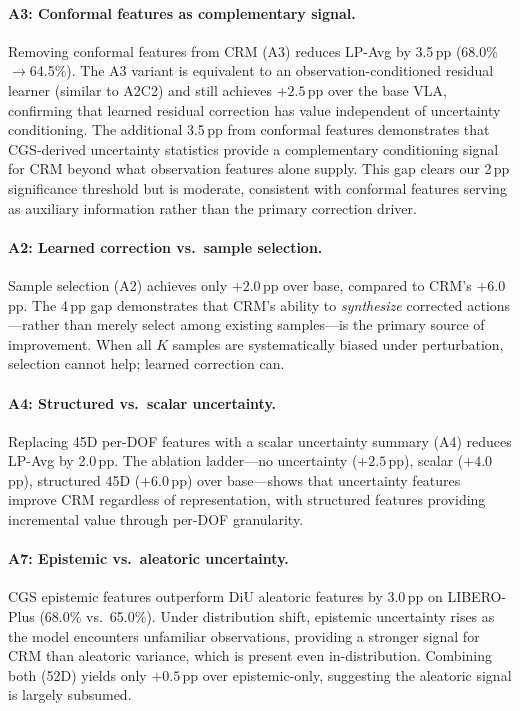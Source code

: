 \documentclass[10pt,twocolumn]{article}
\begin{document}
\paragraph{A3: Conformal features as complementary signal.}
Removing conformal features from CRM (A3) reduces LP-Avg by 3.5\,pp (68.0\%$\to$64.5\%).
The A3 variant is equivalent to an observation-conditioned residual learner (similar to A2C2) and still achieves $+2.5$\,pp over the base VLA, confirming that learned residual correction has value independent of uncertainty conditioning.
The additional 3.5\,pp from conformal features demonstrates that CGS-derived uncertainty statistics provide a complementary conditioning signal for CRM beyond what observation features alone supply.
This gap clears our 2\,pp significance threshold but is moderate, consistent with conformal features serving as auxiliary information rather than the primary correction driver.

\paragraph{A2: Learned correction vs.\ sample selection.}
Sample selection (A2) achieves only $+2.0$\,pp over base, compared to CRM's $+6.0$\,pp.
The 4\,pp gap demonstrates that CRM's ability to \emph{synthesize} corrected actions---rather than merely select among existing samples---is the primary source of improvement.
When all $K$ samples are systematically biased under perturbation, selection cannot help; learned correction can.

\paragraph{A4: Structured vs.\ scalar uncertainty.}
Replacing 45D per-DOF features with a scalar uncertainty summary (A4) reduces LP-Avg by 2.0\,pp.
The ablation ladder---no uncertainty ($+2.5$\,pp), scalar ($+4.0$\,pp), structured 45D ($+6.0$\,pp) over base---shows that uncertainty features improve CRM regardless of representation, with structured features providing incremental value through per-DOF granularity.

\paragraph{A7: Epistemic vs.\ aleatoric uncertainty.}
CGS epistemic features outperform DiU aleatoric features by 3.0\,pp on LIBERO-Plus (68.0\% vs.\ 65.0\%).
Under distribution shift, epistemic uncertainty rises as the model encounters unfamiliar observations, providing a stronger signal for CRM than aleatoric variance, which is present even in-distribution.
Combining both (52D) yields only $+0.5$\,pp over epistemic-only, suggesting the aleatoric signal is largely subsumed.
\end{document}
